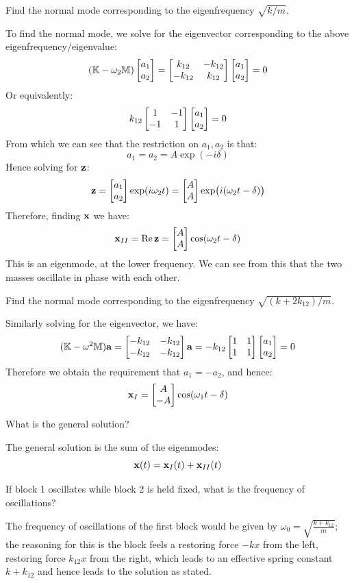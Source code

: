 \documentclass[../PHYS306Notes.tex]{subfiles}
\begin{document}
\begin{p}
Find the normal mode corresponding to the eigenfrequency $\sqrt{k/m}$.
\end{p}
\begin{s}
To find the normal mode, we solve for the eigenvector corresponding to the above eigenfrequency/eigenvalue:
\[(\mathbb{K} - \omega_2\mathbb{M})\begin{bmatrix}a_1 \\ a_2\end{bmatrix} = \begin{bmatrix}k_{12} & - k_{12} \\ -k_{12} & k_{12}\end{bmatrix}\begin{bmatrix}a_1 \\ a_2\end{bmatrix} = 0\]
Or equivalently:
\[k_{12}\begin{bmatrix}1 & -1 \\ -1 & 1\end{bmatrix}\begin{bmatrix}a_1 \\ a_2\end{bmatrix} = 0\]
From which we can see that the restriction on $a_1, a_2$ is that:
\[a_1 = a_2 = A\exp(-i\delta)\]
Hence solving for $\mathbf{z}$:
\[\mathbf{z} = \begin{bmatrix}a_1 \\ a_2\end{bmatrix}\exp(i\omega_2 t) = \begin{bmatrix}A \\ A\end{bmatrix}\exp(i(\omega_2 t - \delta))\]
Therefore, finding $\mathbf{x}$ we have:
\[\mathbf{x}_{II} = \Re\mathbf{z} = \begin{bmatrix}A \\ A\end{bmatrix}\cos(\omega_2 t - \delta)\]
This is an eigenmode, at the lower frequency. We can see from this that the two masses oscillate in phase with each other.
\end{s}

\begin{p}
Find the normal mode corresponding to the eigenfrequency $\sqrt{(k+2k_{12})/m}$.
\end{p}
\begin{s}
Similarly solving for the eigenvector, we have:
\[(\mathbb{K} - \omega^2\mathbb{M})\mathbf{a} = \begin{bmatrix}-k_{12} & -k_{12} \\ -k_{12} & -k_{12}\end{bmatrix}\mathbf{a} = -k_{12}\begin{bmatrix}1 & 1 \\ 1 & 1\end{bmatrix}\begin{bmatrix}a_1 \\ a_2\end{bmatrix} = 0\]
Therefore we obtain the requirement that $a_1 = -a_2$, and hence:
\[\mathbf{x}_I = \begin{bmatrix}A \\ -A\end{bmatrix}\cos(\omega_1 t - \delta)\]
\end{s}

\begin{p}
What is the general solution?
\end{p}
\begin{s}
The general solution is the sum of the eigenmodes:
\[\mathbf{x}(t) = \mathbf{x}_I(t) + \mathbf{x}_{II}(t)\]
\end{s}

\begin{p}
If block 1 oscillates while block 2 is held fixed, what is the frequency of oscillations?
\end{p}
\begin{s}
The frequency of oscillations of the first block would be given by $\omega_0 = \sqrt{\frac{k + k_{12}}{m}}$; the reasoning for this is the block feels a restoring force $-kx$ from the left, restoring force $k_{12}x$ from the right, which leads to an effective spring constant $k + k_{12}$ and hence leads to the solution as stated.
\end{s}
\end{document}
